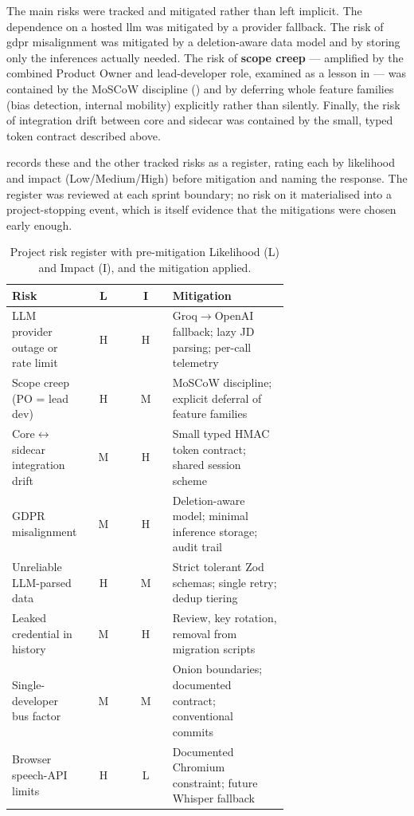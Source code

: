 The main risks were tracked and mitigated rather than left implicit. The
dependence on a hosted \gls{llm} was mitigated by a provider fallback. The risk of \gls{gdpr} misalignment was mitigated by a
deletion-aware data model and by storing only the inferences actually
needed. The risk of \textbf{scope creep} --- amplified by the combined Product Owner
and lead-developer role, examined as a lesson in  --- was
contained by the MoSCoW discipline () and by
deferring whole feature families (bias detection, internal mobility)
explicitly rather than silently. Finally, the risk of
integration drift between core and sidecar was contained by the small, typed
token contract described above.

 records these and the other tracked risks as a
register, rating each by likelihood and impact (Low/Medium/High) before
mitigation and naming the response. The register was reviewed at each sprint
boundary; no risk on it materialised into a project-stopping event, which is
itself evidence that the mitigations were chosen early enough.

\begin{table}[ht]
\centering
\caption[Risk register]{Project risk register with pre-mitigation Likelihood
(L) and Impact (I), and the mitigation applied.}
\label{tab:risk-register}
\small
\begin{tabular}{p{0.27\linewidth}cc p{0.42\linewidth}}
\toprule
\textbf{Risk} & \textbf{L} & \textbf{I} & \textbf{Mitigation} \\
\midrule
LLM provider outage or rate limit & H & H & Groq$\rightarrow$OpenAI fallback; lazy JD parsing; per-call telemetry \\
Scope creep (PO = lead dev) & H & M & MoSCoW discipline; explicit deferral of feature families \\
Core$\leftrightarrow$sidecar integration drift & M & H & Small typed HMAC token contract; shared session scheme \\
GDPR misalignment & M & H & Deletion-aware model; minimal inference storage; audit trail \\
Unreliable LLM-parsed data & H & M & Strict tolerant Zod schemas; single retry; dedup tiering \\
Leaked credential in history & M & H & Review, key rotation, removal from migration scripts \\
Single-developer bus factor & M & M & Onion boundaries; documented contract; conventional commits \\
Browser speech-API limits & H & L & Documented Chromium constraint; future Whisper fallback \\
\bottomrule
\end{tabular}
\end{table}

